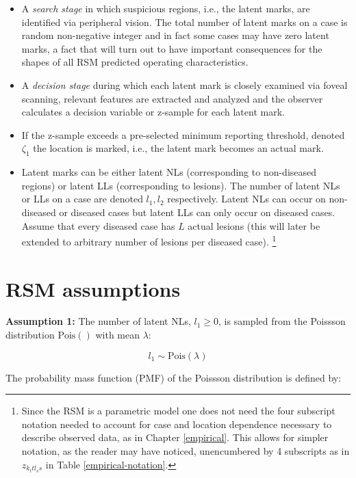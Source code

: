 \documentclass[
]{book}
\begin{document}
\begin{itemize}
\item
  A \emph{search stage} in which suspicious regions, i.e., the latent marks, are identified via peripheral vision. The total number of latent marks on a case is random non-negative integer and in fact some cases may have zero latent marks, a fact that will turn out to have important consequences for the shapes of all RSM predicted operating characteristics.
\item
  A \emph{decision stage} during which each latent mark is closely examined via foveal scanning, relevant features are extracted and analyzed and the observer calculates a decision variable or z-sample for each latent mark.
\item
  If the z-sample exceeds a pre-selected minimum reporting threshold, denoted \(\zeta_1\) the location is marked, i.e., the latent mark becomes an actual mark.
\item
  Latent marks can be either latent NLs (corresponding to non-diseased regions) or latent LLs (corresponding to lesions). The number of latent NLs or LLs on a case are denoted \(l_1, l_2\) respectively. Latent NLs can occur on non-diseased or diseased cases but latent LLs can only occur on diseased cases. Assume that every diseased case has \(L\) actual lesions (this will later be extended to arbitrary number of lesions per diseased case). \footnote{Since the RSM is a parametric model one does not need the four subscript notation needed to account for case and location dependence necessary to describe observed data, as in Chapter \ref{empirical}. This allows for simpler notation, as the reader may have noticed, unencumbered by 4 subscripts as in \(z_{k_ttl_ss}\) in Table \ref{empirical-notation}.}
\end{itemize}

\hypertarget{rsm-assumptions}{%
\section{RSM assumptions}\label{rsm-assumptions}}

\textbf{Assumption 1:} The number of latent NLs, \(l_1 \geq 0\), is sampled from the Poissson distribution \(\text{Pois}()\) with mean \(\lambda\):

\begin{equation} 
l_1 \sim \text{Pois}\left ( \lambda \right ) 
\label{eq:rsm-poisson-sampling}
\end{equation}

The probability mass function (PMF) of the Poissson distribution is defined by:
\end{document}

